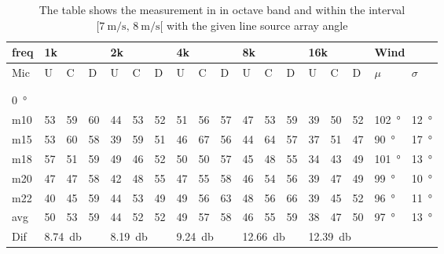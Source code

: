 \begin{table}[H]
\centering
\caption{The table shows the measurement in in octave band and within the interval $[\SI{7}{\meter\per\second},\, \SI{8}{\meter\per\second}[ $ with the given line source array angle}
\setlength\tabcolsep{5pt} %
\begin{tabular}{l|l|l|l|l|l|l|l|l|l|l|l|l|l|l|l|l|l}
freq & \multicolumn{3}{l|}{1k} & \multicolumn{3}{l|}{2k} & \multicolumn{3}{l|}{4k} & \multicolumn{3}{l|}{8k} & \multicolumn{3}{l|}{16k}   &  \multicolumn{2}{l}{Wind}                      \\ \hline
Mic  & U      & C      & D     & U      & C      & D     & U      & C      & D     & U      & C      & D     & U  & C  & D & $\mu$ & $\sigma$ \\ \hline
 & \multicolumn{3}{l|}{} & \multicolumn{3}{l|}{} & \multicolumn{3}{l|}{} & \multicolumn{3}{l|}{} & \multicolumn{3}{l|}{} &      \multicolumn{2}{l}{}                        \\ 
 \multicolumn{18}{l}{ } \\  
\SI{0}{\degree}   & \multicolumn{3}{l|}{} & \multicolumn{3}{l|}{} & \multicolumn{3}{l|}{} & \multicolumn{3}{l|}{} & \multicolumn{3}{l|}{} &  \multicolumn{2}{l}{}   \\  \hline
m10  & 53     & 59     & 60    & 44     & 53     & 52    & 51     & 56     & 57    & 47     & 53     & 59    & 39 & 50 & 52 & \SI{102}{\degree} & \SI{12}{\degree}  \\
m15  & 53     & 60     & 58    & 39     & 59     & 51    & 46     & 67     & 56    & 44     & 64     & 57    & 37 & 51 & 47 & \SI{90}{\degree} & \SI{17}{\degree}  \\
m18  & 57     & 51     & 59    & 49     & 46     & 52    & 50     & 50     & 57    & 45     & 48     & 55    & 34 & 43 & 49 & \SI{101}{\degree} & \SI{13}{\degree}  \\
m20  & 47     & 47     & 58    & 42     & 48     & 55    & 47     & 55     & 58    & 46     & 54     & 56    & 39 & 47 & 49 & \SI{99}{\degree} & \SI{10}{\degree}  \\
m22  & 40     & 45     & 59    & 44     & 53     & 49    & 49     & 56     & 63    & 48     & 56     & 66    & 39 & 45 & 52 & \SI{96}{\degree} & \SI{11}{\degree}  \\ \hline
avg  &  50     &  53   &  59    &  44    & 52     & 52    &  49    &  57    &  58   &  46    &  55    & 59    & 38   & 47   &  50  & \SI{97}{\degree} & \SI{13}{\degree} \\ \hline  
Dif & \multicolumn{3}{l|}{\SI{8.74}{\decibel}} & \multicolumn{3}{l|}{\SI{8.19}{\decibel}} & \multicolumn{3}{l|}{\SI{9.24}{\decibel}} & \multicolumn{3}{l|}{\SI{12.66}{\decibel}} &  \multicolumn{3}{l|}{\SI{12.39}{\decibel}} &  \multicolumn{2}{l}{}  \\ \hline 

\end{tabular}
\end{table}
